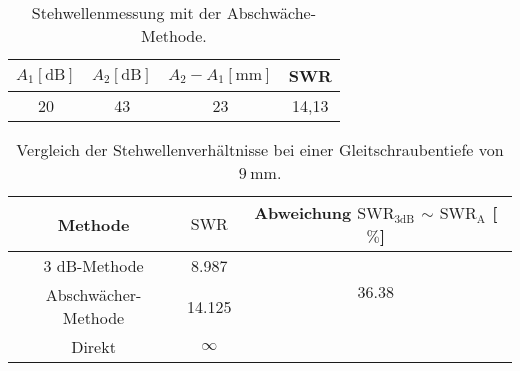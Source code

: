 \begin{table}
    \centering
    \caption{Stehwellenmessung mit der Abschwäche-Methode.}
    \label{tab:Messreihe33}
    \begin{tabular}{c c c c}
        \toprule
        $A_1 [\text{dB}]$ & $A_2 [\text{dB}]$ & $A_2 - A_1 [\si{\milli\meter}]$ & SWR \\
        \midrule
       20 & 43 & 23 & 14,13 \\   
     \end{tabular}
\end{table}

\begin{table}
    \centering
    \caption{Vergleich der Stehwellenverhältnisse bei einer Gleitschraubentiefe von $ \SI{9}{\milli\meter}$.}
    \label{tab:1111}
    \begin{tabular}{c  c || c }
        \toprule
        Methode & $\text{SWR}$ & Abweichung \hspace{0.5cm} $\text{SWR}_{\text{3dB}}$ $\sim$ $\text{SWR}_{\text{A}}$ \hspace{0.5cm} [$\%$]  \\
        \midrule
         3 dB-Methode        & 8.987 & \multirow{2}{*}{36.38} \\
         Abschwächer-Methode & 14.125 & \\ 
         Direkt              & $ \infty$ & \\ 
     \end{tabular}
\end{table}

